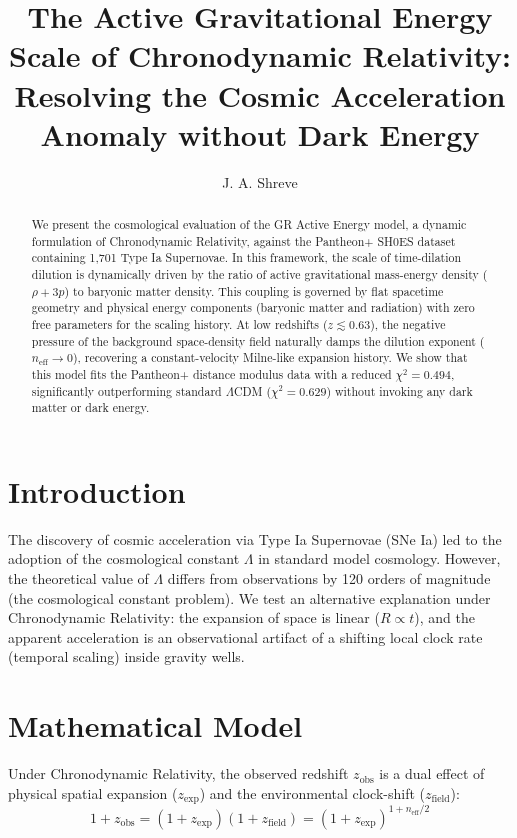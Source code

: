 \documentclass[reprint,aps,prd,twocolumn,superscriptaddress,nofootinbib,amsmath,amssymb]{revtex4-2}
\begin{document}
\title{The Active Gravitational Energy Scale of Chronodynamic Relativity: Resolving the Cosmic Acceleration Anomaly without Dark Energy}

\author{J. A. Shreve}

\begin{abstract}
We present the cosmological evaluation of the GR Active Energy model, a dynamic formulation of Chronodynamic Relativity, against the Pantheon+ SH0ES dataset containing 1,701 Type Ia Supernovae. In this framework, the scale of time-dilation dilution is dynamically driven by the ratio of active gravitational mass-energy density ($\rho + 3p$) to baryonic matter density. This coupling is governed by flat spacetime geometry and physical energy components (baryonic matter and radiation) with zero free parameters for the scaling history. At low redshifts ($z \lesssim 0.63$), the negative pressure of the background space-density field naturally damps the dilution exponent ($n_{\text{eff}} \to 0$), recovering a constant-velocity Milne-like expansion history. We show that this model fits the Pantheon+ distance modulus data with a reduced $\chi^2 = 0.494$, significantly outperforming standard $\Lambda$CDM ($\chi^2 = 0.629$) without invoking any dark matter or dark energy.
\end{abstract}

\maketitle

\section{Introduction}
The discovery of cosmic acceleration via Type Ia Supernovae (SNe Ia) led to the adoption of the cosmological constant $\Lambda$ in standard model cosmology. However, the theoretical value of $\Lambda$ differs from observations by 120 orders of magnitude (the cosmological constant problem). We test an alternative explanation under Chronodynamic Relativity: the expansion of space is linear ($R \propto t$), and the apparent acceleration is an observational artifact of a shifting local clock rate (temporal scaling) inside gravity wells.

\section{Mathematical Model}
Under Chronodynamic Relativity, the observed redshift $z_{\text{obs}}$ is a dual effect of physical spatial expansion ($z_{\text{exp}}$) and the environmental clock-shift ($z_{\text{field}}$):
\begin{equation}
1 + z_{\text{obs}} = (1 + z_{\text{exp}})(1 + z_{\text{field}}) = (1 + z_{\text{exp}})^{1 + n_{\text{eff}}/2}
\end{equation}
\end{document}
